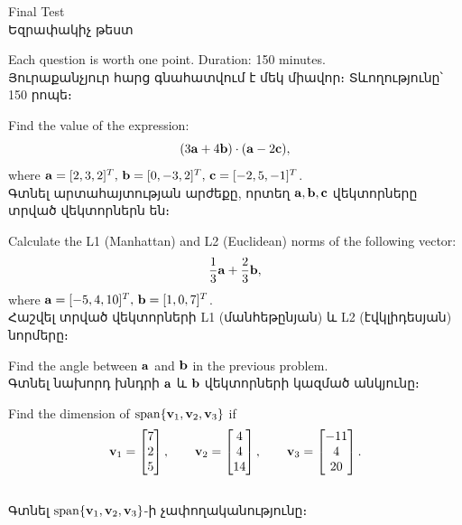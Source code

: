 
 \begin{center}\begin{large} Final Test\\
\textarmenian{Եզրափակիչ թեստ}
 \vspace{1em}
 
 \end{large}\end{center}
 \small Each question is worth one point. Duration: 150 minutes.\\
\textarmenian{Յուրաքանչյուր հարց գնահատվում է մեկ միավոր։ Տևողությունը՝ 150 րոպե։}
 \bigskip

 
\begin{problem}
Find the value of the expression:
\[ (3\mathbf{a}+4\mathbf{b})\cdot (\mathbf{a}-2\mathbf{c}), \]
where
$\mathbf{a}=[2, 3, 2]^T,\,\mathbf{b}=[0, -3, 2]^T,\,\mathbf{c}=[-2, 5, -1]^T$.
\\
\textarmenian{Գտնել արտահայտության արժեքը, որտեղ $\mathbf{a}, \mathbf{b}, \mathbf{c}$ վեկտորները տրված վեկտորներն են։}
\end{problem}
\medskip

\begin{problem}
Calculate the L1 (Manhattan) and L2 (Euclidean) norms of the following vector:
\[ \dfrac{1}{3}\mathbf{a}+\dfrac{2}{3}\mathbf{b}, \]
where $\mathbf{a}=[-5,4,10]^T,\,\mathbf{b}=[1,0,7]^T$.
\\
\textarmenian{Հաշվել տրված վեկտորների {\rm L1} (մանհեթընյան) և {\rm L2} (էվկլիդեսյան) նորմերը։}
\end{problem}
\medskip

\begin{problem}
Find the angle between $\mathbf{a}$ and $\mathbf{b}$ in the previous problem.
\\
\textarmenian{Գտնել նախորդ խնդրի $\mathbf{a}$ և $\mathbf{b}$ վեկտորների կազմած անկյունը։}
\end{problem}
\medskip

\begin{problem}
Find the dimension of $\operatorname{span}\{\mathbf{v}_1,\mathbf{v}_2,\mathbf{v}_3\}$ if
\[
\mathbf{v}_1 = \begin{bmatrix}
    7 \\ 2 \\ 5
\end{bmatrix},
\qquad
\mathbf{v}_2 = \begin{bmatrix}
    4 \\ 4 \\ 14
\end{bmatrix},
\qquad
\mathbf{v}_3 = \begin{bmatrix}
    -11 \\ 4 \\ 20
\end{bmatrix}.
\]
\\
\textarmenian{Գտնել $\operatorname{span}\{\mathbf{v}_1,\mathbf{v}_2,\mathbf{v}_3\}$-ի չափողականությունը։}
\end{problem}
\medskip

